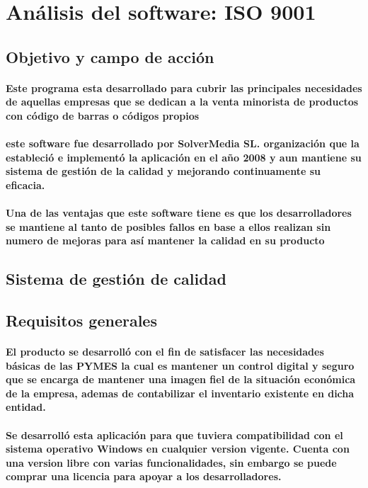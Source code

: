 \documentclass[12pt,a4paper]{article}
\begin{document}
\section{Análisis del software: ISO 9001}
\subsection{Objetivo y campo de acción}
\paragraph{Este programa esta desarrollado para cubrir las principales necesidades de aquellas empresas que se dedican a la venta minorista de productos con código de barras o códigos propios}
\paragraph{este software fue desarrollado por SolverMedia SL. organización que la estableció e implementó la aplicación en el año 2008 y aun mantiene su sistema de gestión de la calidad y mejorando continuamente su eficacia.}
\paragraph{Una de las ventajas que este software tiene es que los desarrolladores se mantiene al tanto de posibles fallos en base a ellos realizan sin numero de mejoras para así mantener la calidad en su producto}

\subsection{Sistema de gestión de calidad}
\subsection*{Requisitos generales}
\paragraph{El producto se desarrolló con el fin de satisfacer las necesidades básicas de las PYMES la cual es mantener un control digital y seguro que se encarga de mantener una imagen fiel de la situación económica de la empresa, ademas de contabilizar el inventario existente en dicha entidad.}
\paragraph{Se desarrolló esta aplicación para que tuviera compatibilidad con el sistema operativo Windows en cualquier version vigente. Cuenta con una version libre con varias funcionalidades, sin embargo se puede comprar una licencia para apoyar a los desarrolladores.}
\end{document}
